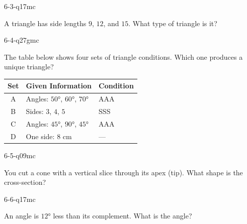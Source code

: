 \begin{practiceQuestion}{6-3-q17}{mc}
\begin{questionText}
A triangle has side lengths $9$, $12$, and $15$. What type of triangle is it?
\end{questionText}
\end{practiceQuestion}

\begin{practiceQuestion}{6-4-q27}{gmc}
\begin{questionText}
The table below shows four sets of triangle conditions. Which one produces a unique triangle?

\begin{center}
\begin{tabular}{|c|l|l|}
\hline
\textbf{Set} & \textbf{Given Information} & \textbf{Condition} \\
\hline
A & Angles: $50°$, $60°$, $70°$ & AAA \\
\hline
B & Sides: $3$, $4$, $5$ & SSS \\
\hline
C & Angles: $45°$, $90°$, $45°$ & AAA \\
\hline
D & One side: $8$ cm & --- \\
\hline
\end{tabular}
\end{center}
\end{questionText}
\end{practiceQuestion}

\begin{practiceQuestion}{6-5-q09}{mc}
\begin{questionText}
You cut a cone with a vertical slice through its apex (tip). What shape is the cross-section?
\end{questionText}
\end{practiceQuestion}

\begin{practiceQuestion}{6-6-q17}{mc}
\begin{questionText}
An angle is $12°$ less than its complement. What is the angle?
\end{questionText}
\end{practiceQuestion}


